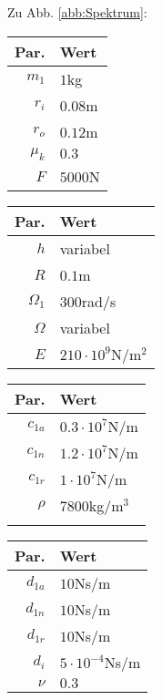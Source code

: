 Zu Abb. \ref{abb:Spektrum}:
\begin{center}
	\begin{tabular}{r|l}
		Par.&Wert\\\hline
		$m_1$&$1$kg\\
		$r_i$&$0.08$m\\
		$r_o$&$0.12$m\\
		$\mu_k$& $0.3$\\
		$F$&$5000$N\\
	\end{tabular}\hfill
	\begin{tabular}{r|l}
		Par.&Wert\\\hline
		$h$&variabel\\
		$R$&$0.1$m\\
		$\Omega_1$&$300$rad/s\\
		$\Omega$& variabel \\
		$E$&$210\cdot10^9$N/m$^2$\\
	\end{tabular}\hfill
	\begin{tabular}{r|l}
		Par.&Wert\\\hline
		$c_{1a}$&$0.3\cdot10^{7}$N/m\\
		$c_{1n}$&$1.2\cdot10^{7}$N/m\\
		$c_{1r}$&$1\cdot10^{7}$N/m\\
		$\rho$&$7800$kg/m$^3$\\
		&
	\end{tabular}\hfill
	\begin{tabular}{r|l}
		Par.&Wert\\\hline
		$d_{1a}$&$10$Ns/m\\
		$d_{1n}$&$10$Ns/m\\
		$d_{1r}$&$10$Ns/m\\
		$d_i$ &$5\cdot10^{-4}$Ns/m\\
		$\nu$&$0.3$\\
	\end{tabular}
\end{center}


